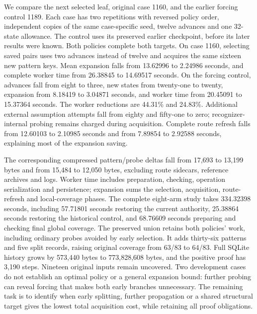 \documentclass[11pt,a4paper]{article}
\numberwithin{equation}{section}
\theoremstyle{plain}
\theoremstyle{definition}
\theoremstyle{remark}
\begin{document}
We compare the next selected leaf, original case 1160, and the earlier forcing control 1189. Each case has two repetitions with reversed policy order, independent copies of the same case-specific seed, twelve advances and one 32-state allowance. The control uses its preserved earlier checkpoint, before its later results were known. Both policies complete both targets. On case 1160, selecting saved pairs uses two advances instead of twelve and acquires the same sixteen new pattern keys. Mean expansion falls from 13.62996 to 2.24986 seconds, and complete worker time from 26.38845 to 14.69517 seconds. On the forcing control, advances fall from eight to three, new states from twenty-one to twenty, expansion from 8.18419 to 3.04871 seconds, and worker time from 20.45091 to 15.37364 seconds. The worker reductions are 44.31\% and 24.83\%. Additional external assumption attempts fall from eighty and fifty-one to zero; recognizer-internal probing remains charged during acquisition. Complete route refresh falls from 12.60103 to 2.10985 seconds and from 7.89854 to 2.92588 seconds, explaining most of the expansion saving.

The corresponding compressed pattern/probe deltas fall from 17,693 to 13,199 bytes and from 15,484 to 12,050 bytes, excluding route sidecars, reference archives and logs. Worker time includes preparation, checking, operation serialization and persistence; expansion sums the selection, acquisition, route-refresh and local-coverage phases. The complete eight-arm study takes 334.32398 seconds, including 57.71801 seconds restoring the current authority, 25.38864 seconds restoring the historical control, and 68.76609 seconds preparing and checking final global coverage. The preserved union retains both policies' work, including ordinary probes avoided by early selection. It adds thirty-six patterns and five split records, raising original coverage from 63/83 to 64/83. Full SQLite history grows by 573,440 bytes to 773,828,608 bytes, and the positive proof has 3,190 steps. Nineteen original inputs remain uncovered. Two development cases do not establish an optimal policy or a general expansion bound: further probing can reveal forcing that makes both early branches unnecessary. The remaining task is to identify when early splitting, further propagation or a shared structural target gives the lowest total acquisition cost, while retaining all proof obligations.
\end{document}
